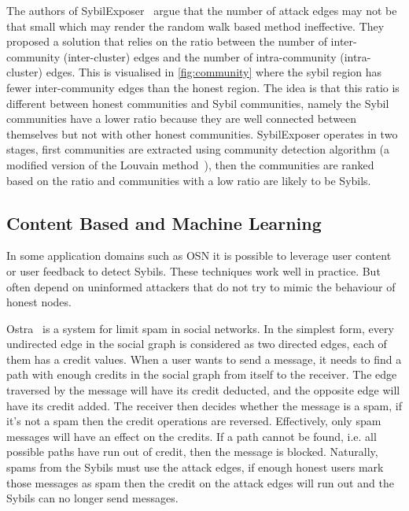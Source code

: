 The authors of SybilExposer~\cite{misra2016sybilexposer} argue that the number
of attack edges may not be that small which may render the random walk based
method ineffective. They proposed a solution that relies on the ratio between
the number of inter-community (inter-cluster) edges and the number of
intra-community (intra-cluster) edges. This is visualised in
\autoref{fig:community} where the sybil region has fewer
inter-community edges than the honest region. The idea is that this ratio is
different between honest communities and Sybil communities, namely the Sybil
communities have a lower ratio because they are well connected between
themselves but not with other honest communities. SybilExposer operates in two
stages, first communities are extracted using community detection algorithm (a
modified version of the Louvain method~\cite{blondel2008fast}), then the
communities are ranked based on the ratio and communities with a low ratio are
likely to be Sybils.


\subsection{Content Based and Machine Learning}
\label{sec:content-based}
In some application domains such as OSN it is possible to leverage user content
or user feedback to detect Sybils. These techniques work well in practice. But
often depend on uninformed attackers that do not try to mimic the behaviour of
honest nodes.

Ostra~\cite{mislove2008ostra} is a system for limit spam in social networks.
In the simplest form, every undirected edge in the social graph is considered as
two directed edges, each of them has a credit values. When a user wants to send
a message, it needs to find a path with enough credits in the social graph from
itself to the receiver. The edge traversed by the message will have its credit
deducted, and the opposite edge will have its credit added. The receiver then
decides whether the message is a spam, if it's not a spam then the credit
operations are reversed. Effectively, only spam messages will have an effect on
the credits. If a path cannot be found, i.e. all possible paths have run out of
credit, then the message is blocked. Naturally, spams from the Sybils must use
the attack edges, if enough honest users mark those messages as spam then the
credit on the attack edges will run out and the Sybils can no longer send
messages.

